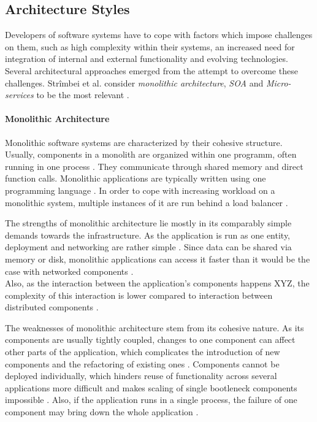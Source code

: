 
\subsection{Architecture Styles} %
  \label{sub:application_structure}
  Developers of software systems have to cope with factors which impose challenges on them, such as high complexity within their systems, an increased need for integration of internal and external functionality and evolving technologies. Several architectural approaches emerged from the attempt to overcome these challenges. Strîmbei et al. consider \emph{monolithic architecture}, \emph{\ac{SOA}} and \emph{Micro-services} to be the most relevant \cite[p.~13]{Strimbei2015Software}.

  \paragraph{Monolithic Architecture} %
    \label{par:monolithic_architecture}
    Monolithic software systems are characterized by their cohesive structure. Usually, components in a monolith are organized within one programm, often running in one process \cite[p.~35]{Stubbs2015Distributed}. They communicate through shared memory and direct function calls. Monolithic applications are typically written using one programming language \cite[p.~14]{Strimbei2015Software}. In order to cope with increasing workload on a monolithic system, multiple instances of it are run behind a load balancer \cite[p.~35]{Stubbs2015Distributed}.

    The strengths of monolithic architecture lie mostly in its comparably simple demands towards the infrastructure. As the application is run as one entity, deployment and networking are rather simple \cite[p.~35]{Stubbs2015Distributed}. Since data can be shared via memory or disk, monolithic applications can access it faster than it would be the case with networked components \cite[p.~14]{Strimbei2015Software}. \\
    Also, as the interaction between the application's components happens XYZ, the complexity of this interaction is lower compared to interaction between distributed components \cite[p.~14]{Strimbei2015Software}.

    The weaknesses of monolithic architecture stem from its cohesive nature. As its components are usually tightly coupled, changes to one component can affect other parts of the application, which complicates the introduction of new components and the refactoring of existing ones \cite{Stubbs2015Distributed}.
    Components cannot be deployed individually, which hinders reuse of functionality across several applications more difficult and makes scaling of single bootleneck components impossible \cite{Stubbs2015Distributed}. Also, if the application runs in a single process, the failure of one component may bring down the whole application \cite[p.~5]{Newman2015Building}.

